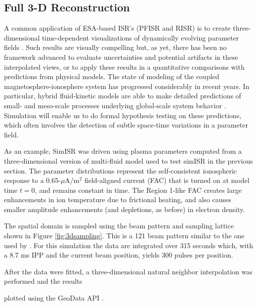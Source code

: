 \documentclass[draft,ras]{agutex}
\begin{document}
\begin{article}
\subsection{Full 3-D Reconstruction}

A common application of ESA-based ISR's (PFISR and RISR) is to create three-dimensional time-dependent visualizations of  dynamically evolving parameter fields \citep[e.g.,][]{Nicolls:2007ie,Semeter2009738,semeter:jgr2010,dahlgren2012di}.   Such results are visually compelling but, as yet, there has been no framework advanced to evaluate uncertainties and potential artifacts in these interpolated views, or to apply these results in a quantitative comparisons with predictions from physical models.  The state of modeling of the coupled magnetosphere-ionosphere system has progressed considerably in recent years. In particular, hybrid fluid-kinetic models are able to make detailed  predictions of small- and meso-scale processes underlying global-scale system behavior \citep[e.g.,][]{damiano;jgr2005,semeter:plasmatransport2012,akbari:jgr2016}.  Simulation will enable us to do formal hypothesis testing on these predictions, which often involves the detection of subtle space-time variations in a parameter field.

As an example, SimISR was driven using plasma parameters computed from a three-dimensional version of multi-fluid model \citep{zettergren2015dynamics} used to test simISR in the previous section. The parameter distributions represent the self-consistent ionospheric response to a 0.65-$\mu$A/m$^2$ field-aligned current (FAC) that is turned on at model time $t=0$, and remains constant in time.  The Region 1-like FAC creates large enhancements in ion temperature due to frictional heating, and also causes smaller amplitude enhancements (and depletions, as before) in electron density.

The spatial domain is sampled using the beam pattern and sampling lattice shown in Figure \ref{fig:3dsampling}. This is a 121 beam pattern similar to the one used by \cite{Semeter:2008hs}. For this simulation the data are integrated over 315 seconds which, with a 8.7 ms IPP and the current beam position, yields 300 pulses per position.

After the data were fitted, a three-dimensional natural neighbor interpolation was performed \citep{Sukumar:nn2001} and the results

plotted using the GeoData API \citep{john_swoboda_2016_154536}.


\end{article}
\end{document}
